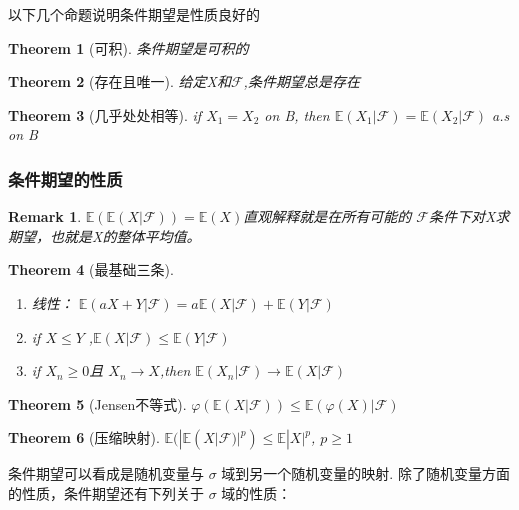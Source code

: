 \documentclass{article}
\newtheorem{theorem}{Theorem}
\newtheorem{remark}{Remark}
\begin{document}
以下几个命题说明条件期望是性质良好的
\begin{theorem}[可积]
    条件期望是可积的
\end{theorem}

\begin{theorem}[存在且唯一]
    给定X和$ \mathcal{F} $,条件期望总是存在
\end{theorem}

\begin{theorem}[几乎处处相等]
    if $ X_1=X_2  $ on B, then $ \mathbb{E}(X_1|\mathcal{F})=\mathbb{E}(X_2|\mathcal{F}) $ a.s on B
\end{theorem}




\subsubsection{条件期望的性质}
\begin{remark}
    $ \mathbb{E}(\mathbb{E}(X|\mathcal{F}))=\mathbb{E}(X) $直观解释就是在所有可能的 $ \mathcal{F} $条件下对X求期望，也就是X的整体平均值。
\end{remark}
 \begin{theorem}[最基础三条]
    \begin{enumerate}
        \item 线性： $ \mathbb{E}(aX+Y|\mathcal{F})=a\mathbb{E}(X|\mathcal{F}) +\mathbb{E}(Y|\mathcal{F})$
        \item if $ X \leqslant Y $ ,$ \mathbb{E}(X|\mathcal{F}) \leqslant \mathbb{E}(Y|\mathcal{F}) $
        \item if $ X_n \geqslant 0  $且 $ X_n \rightarrow X $,then $ \mathbb{E}(X_n|\mathcal{F}) \rightarrow\mathbb{E}(X|\mathcal{F}) $
    \end{enumerate}
 \end{theorem}
\begin{theorem}[Jensen不等式]
    $ \varphi ( \mathbb{E}(X|\mathcal{F}) ) \leqslant  \mathbb{E}(\varphi (X)|\mathcal{F}) $
\end{theorem}
\begin{theorem}[压缩映射]
    $ \mathbb{E}(|\mathbb{E}(X|\mathcal{F})|^p) \leqslant \mathbb{E}|X|^p$, $ p \geqslant 1 $
\end{theorem}
条件期望可以看成是随机变量与 $ \sigma $ 域到另一个随机变量的映射. 除了随机变量方面的性质，条件期望还有下列关于 $ \sigma $ 域的性质：
\end{document}
